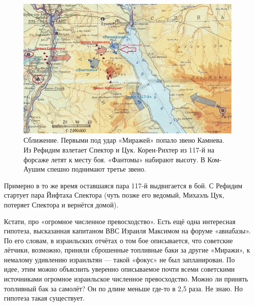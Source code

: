 \begin{figure}[h!tb] 
	\centering\includegraphics[scale=0.25]{Dolina_5/hqH_3szaow8.jpg}
	\caption{Сближение. Первыми под удар «Миражей» попало звено Камнева. Из Рефидим взлетает Спектор и Цук. Корен-Рихтер из 117-й на форсаже летят к месту боя. «Фантомы» набирают высоту. В Ком-Аушим спешно поднимают третье звено. }%
\end{figure}

Примерно в то же время оставшаяся пара 117-й выдвигается в бой. С Рефидим стартует пара Йифтаха Спектора (чуть позже его ведомый, Михаэль Цук, потеряет Спектора и вернётся домой).

Кстати, про «огромное численное превосходство». Есть ещё одна интересная гипотеза, высказанная капитаном ВВС Израиля Максимом на форуме «авиабазы». По его словам, в израильских отчётах о том бое описывается, что советские лётчики, возможно, приняли сброшенные топливные баки за другие «Миражи», к немалому удивлению израильтян — такой «фокус» не был запланирован. По идее, этим можно объяснить уверенно описываемое почти всеми советскими источниками огромное израильское численное превосходство. Можно ли принять топливный бак за самолёт? Он по длине меньше где-то в 2,5 раза. Не знаю. Но гипотеза такая существует.

